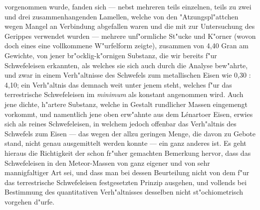 \documentclass[a4paper, 11pt, oneside, german]{article}
\begin{document}
{vorgenommen wurde, fanden sich --- nebst mehreren teils einzelnen, teils zu zwei und drei zusammenhangenden Lamellen, welche von den "Atzungspl"attchen wegen Mangel an Verbindung abgefallen waren und die mit zur Untersuchung des Gerippes verwendet wurden --- mehrere unf"ormliche St"ucke und K"orner (wovon doch eines eine vollkommene W"urfelform zeigte), zusammen von 4,40 Gran am Gewichte, von jener br"ocklig-k"ornigen Substanz, die wir bereits f"ur Schwefeleisen erkannten, als welches sie sich auch durch die Analyse bew"ahrte, und zwar in einem Verh"altnisse des Schwefels zum metallischen Eisen wie 0,30 : 4,10; ein Verh"altnis das demnach weit unter jenem steht, welches f"ur das terrestrische Schwefeleisen im \emph{minimum} als konstant angenommen wird. Auch jene dichte, h"artere Substanz, welche in Gestalt rundlicher Massen eingemengt vorkommt, und namentlich jene oben erw"ahnte aus dem Lénartoer Eisen, erwies sich als reines Schwefeleisen, in welchem jedoch offenbar das Verh"altnis des Schwefels zum Eisen --- das wegen der allzu geringen Menge, die davon zu Gebote stand, nicht genau ausgemittelt werden konnte --- ein ganz anderes ist. Es geht hieraus die Richtigkeit der schon fr"uher gemachten Bemerkung hervor, dass das Schwefeleisen in den Meteor-Massen von ganz eigener und von sehr mannigfaltiger Art sei, und dass man bei dessen Beurteilung nicht von dem f"ur das terrestrische Schwefeleisen festgesetzten Prinzip ausgehen, und vollends bei Bestimmung des quantitativen Verh"altnisses desselben nicht st"ochiometrisch vorgehen d"urfe.\\
}
\end{document}

